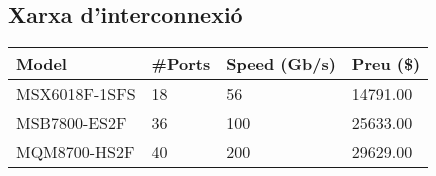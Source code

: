 \subsection{Xarxa d'interconnexió}


\begin{table}[]
\begin{tabular}{l|l|l|l}
\hline
Model         & \#Ports & Speed (Gb/s) & Preu (\$) \\ \hline
MSX6018F-1SFS & 18      & 56           & 14791.00  \\ \hline
MSB7800-ES2F  & 36      & 100          & 25633.00  \\ \hline
MQM8700-HS2F  & 40      & 200          & 29629.00  \\ \hline
\end{tabular}
\end{table}
